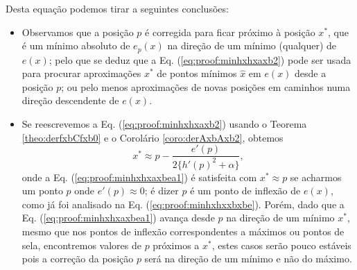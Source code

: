 \begin{myproofT}
Desta equação podemos tirar a seguintes conclusões:


\begin{itemize}

\item Observamos que a posição $p$ é corregida para ficar próximo à posição $x^*$, 
que é um mínimo absoluto de $e_p(x)$ na direção de um mínimo (qualquer) de $e(x)$;
pelo que se deduz que a Eq. (\ref{eq:proof:minhxhxaxb2})
pode ser usada para procurar aproximações $x^*$ de pontos mínimos $\hat{x}$ em $e(x)$ desde a posição $p$;
ou pelo menos aproximações de novas posições em caminhos numa direção descendente de $e(x)$.

\item Se reescrevemos a Eq. (\ref{eq:proof:minhxhxaxb2}) usando o Teorema \ref{theo:derfxbCfxb0}
e o Corolário \ref{coro:derAxbAxb2},
obtemos
\begin{equation}\label{eq:proof:minhxhxaxbea1}
x^* \approx p -
\frac{ e'(p)}{2 \{h'(p)^2+\alpha\} },
\end{equation}
onde a Eq. (\ref{eq:proof:minhxhxaxbea1}) é satisfeita 
com $x^* \approx p$
se acharmos um  ponto $p$ onde  
$e'(p)\approx 0$; 
é dizer $p$ é um ponto de inflexão de $e(x)$, como já foi analisado na Eq. (\ref{eq:proof:minhxhxxbxbe}).
Porém, dado que a Eq. (\ref{eq:proof:minhxhxaxbea1}) avança desde $p$ na direção de um mínimo $x^*$, 
mesmo que nos pontos de inflexão correspondentes a máximos ou pontos de sela,
encontremos valores de $p$ próximos a $x^*$,
 estes casos serão pouco estáveis pois
a correção da posição $p$ será na direção de um mínimo e não do máximo.


\end{itemize}
\end{myproofT}
